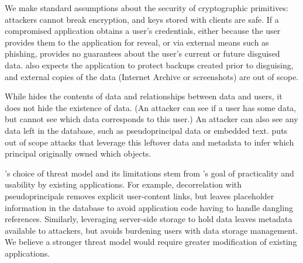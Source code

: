 %
We make standard assumptions about the security of cryptographic primitives:
attackers cannot break encryption, and keys stored with clients are safe.
%
If a compromised application obtains a user's credentials, either because the
user provides them to the application for reveal, or via external means such as
phishing, \sys provides no guarantees about the user's current or future
disguised data.
%
\sys also expects the application to protect backups created prior to
disguising, and external copies of the data (\eg Internet Archive or
screenshots) are out of scope.
%

%
While \sys hides the contents of \xxed data and relationships between \xxed data
and users, it does not hide the existence of
\xxed data. (An attacker can see if
a user has \xxed some data, but cannot see which \xxed data corresponds to this
user.)
%
An attacker can also see any data left in the database, such as pseudoprincipal
data or embedded text.
%
\sys puts out of scope attacks that leverage this leftover data
and metadata to infer which principal originally owned which objects.
%

\sys's choice of threat model and its limitations stem from
\sys's goal of practicality and usability by existing applications.
%
For example, decorrelation with pseudoprincipals removes explicit user-content
links, but leaves placeholder information in the database to avoid application
code having to handle dangling references.
%
Similarly, leveraging server-side storage to hold \xxed data leaves
metadata available to attackers, but avoids burdening users with data storage
management.
%
We believe a stronger threat model would require greater modification of
existing applications.

